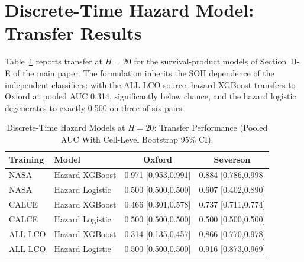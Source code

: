 \documentclass[11pt,a4paper]{article}
\begin{document}
\section{Discrete-Time Hazard Model: Transfer Results}
Table~\ref{tab:s_hazard} reports transfer at $H{=}20$ for the survival-product models of Section~II-E of the main paper. The formulation inherits the SOH dependence of the independent classifiers: with the ALL-LCO source, hazard XGBoost transfers to Oxford at pooled AUC 0.314, significantly below chance, and the hazard logistic degenerates to exactly 0.500 on three of six pairs.
\begin{table}[!htbp]
\caption{Discrete-Time Hazard Models at $H{=}20$: Transfer Performance (Pooled AUC With Cell-Level Bootstrap 95\% CI).}
\label{tab:s_hazard}
\centering\footnotesize\setlength{\tabcolsep}{3pt}
\begin{tabular}{llcc}
\toprule
\textbf{Training} & \textbf{Model} & \textbf{Oxford} & \textbf{Severson}\\
\midrule
NASA & Hazard XGBoost & 0.971 [0.953,0.991] & 0.884 [0.786,0.998]\\
NASA & Hazard Logistic & 0.500 [0.500,0.500] & 0.607 [0.402,0.890]\\
CALCE & Hazard XGBoost & 0.466 [0.301,0.578] & 0.737 [0.711,0.774]\\
CALCE & Hazard Logistic & 0.500 [0.500,0.500] & 0.500 [0.500,0.500]\\
ALL LCO & Hazard XGBoost & 0.314 [0.135,0.457] & 0.866 [0.770,0.978]\\
ALL LCO & Hazard Logistic & 0.500 [0.500,0.500] & 0.916 [0.873,0.969]\\
\bottomrule
\end{tabular}
\end{table}
\end{document}
